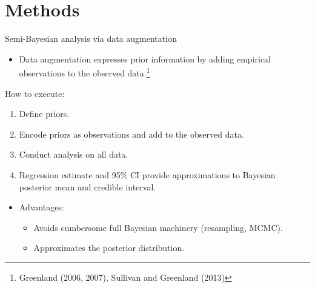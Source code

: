 \documentclass[english]{beamer}\usepackage[]{graphicx}\usepackage[]{color}
\begin{document}
\section{Methods}
\begin{frame}{Semi-Bayesian analysis via data augmentation}
\begin{itemize}
\item Data augmentation expresses prior information by adding empirical
observations to the observed data.\footnote{Greenland (2006, 2007), Sullivan and Greenland (2013)}
\end{itemize}

\pause{}

\medskip{}

How to execute:
\begin{enumerate}
\item Define priors.
\item Encode priors as observations and add to the observed data.
\item Conduct analysis on all data.
\item Regression estimate and 95\% CI provide approximations to Bayesian
posterior mean and credible interval.
\end{enumerate}

\pause{}
\begin{itemize}
\item Advantages: 
\begin{itemize}
\item Avoids cumbersome full Bayesian machinery (resampling, MCMC).
\item Approximates the posterior distribution.
\end{itemize}
\end{itemize}
\end{frame}
%
\end{document}
